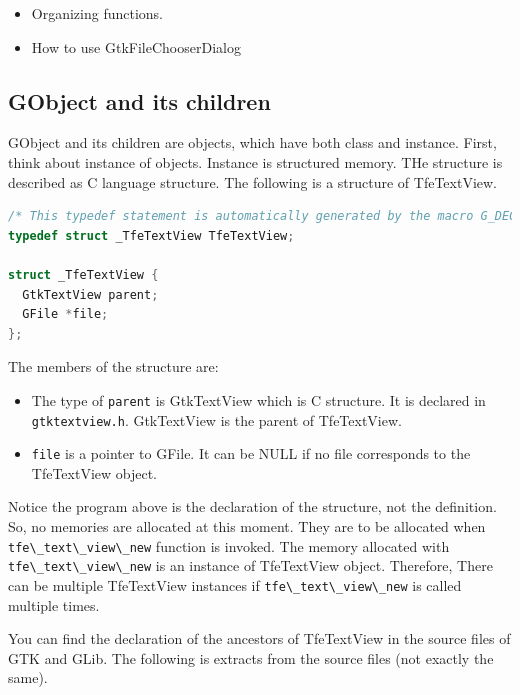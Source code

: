 \begin{itemize}
\tightlist
\item
  Organizing functions.
\item
  How to use GtkFileChooserDialog
\end{itemize}

\hypertarget{gobject-and-its-children}{%
\subsection{GObject and its children}\label{gobject-and-its-children}}

GObject and its children are objects, which have both class and
instance. First, think about instance of objects. Instance is structured
memory. THe structure is described as C language structure. The
following is a structure of TfeTextView.

\begin{lstlisting}[language=C]
/* This typedef statement is automatically generated by the macro G_DECLARE_FINAL_TYPE */
typedef struct _TfeTextView TfeTextView;

struct _TfeTextView {
  GtkTextView parent;
  GFile *file;
};
\end{lstlisting}

The members of the structure are:

\begin{itemize}
\tightlist
\item
  The type of \passthrough{\lstinline!parent!} is GtkTextView which is C
  structure. It is declared in \passthrough{\lstinline!gtktextview.h!}.
  GtkTextView is the parent of TfeTextView.
\item
  \passthrough{\lstinline!file!} is a pointer to GFile. It can be NULL
  if no file corresponds to the TfeTextView object.
\end{itemize}

Notice the program above is the declaration of the structure, not the
definition. So, no memories are allocated at this moment. They are to be
allocated when \passthrough{\lstinline!tfe\_text\_view\_new!} function
is invoked. The memory allocated with
\passthrough{\lstinline!tfe\_text\_view\_new!} is an instance of
TfeTextView object. Therefore, There can be multiple TfeTextView
instances if \passthrough{\lstinline!tfe\_text\_view\_new!} is called
multiple times.

You can find the declaration of the ancestors of TfeTextView in the
source files of GTK and GLib. The following is extracts from the source
files (not exactly the same).

